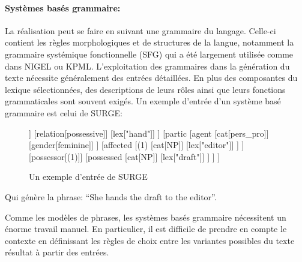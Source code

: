	\paragraph{Systèmes basés grammaire:} La réalisation peut se faire en suivant une grammaire du langage. Celle-ci contient les règles morphologiques et de structures de la langue, notamment la grammaire systémique fonctionnelle (SFG)\cite{Halliday2004} qui a été largement utilisée comme dans NIGEL\cite{Mann1983} ou KPML\cite{Bateman1997}. L’exploitation des grammaires dans la génération du texte nécessite généralement des entrées détaillées. En plus des composantes du lexique sélectionnées, des descriptions de leurs rôles ainsi que leurs fonctions grammaticales sont souvent exigés. Un exemple d’entrée d’un système basé grammaire est celui de SURGE\cite{Elhadad1996}:
\begin{figure}	
	\begin{center}
		\begin{forest} [
			[cat:clause]
			[process
			[type[composite]]
			[relation[possessive]]
			[lex[\color{red}"hand"]]
			]
			[partic
			[agent
			[cat[pers\_pro]]
			[gender[feminine]]
			]
			[affected
			[(1)
			[cat[NP]]
			[lex[\color{red}"editor"]]
			]
			]
			[possessor[(1)]]
			[possessed
			[cat[NP]]
			[lex[\color{red}"draft"]]
			]
			]
			]
		\end{forest}
	\end{center}
	\caption{Un exemple d'entrée de SURGE\cite{Elhadad1996}} 
\end{figure}
	Qui génère la phrase: “She hands the draft to the editor”.\newline

Comme les modèles de phrases, les systèmes basés grammaire nécessitent un énorme travail manuel. En particulier, il est difficile de prendre en compte le contexte en définissant les règles de choix entre les variantes possibles du texte résultat à partir des entrées\cite{Gatt2018}.

